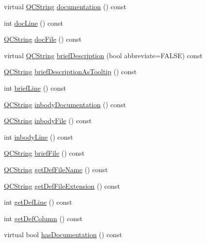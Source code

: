 \begin{DoxyCompactItemize}
virtual \mbox{\hyperlink{class_q_c_string}{Q\+C\+String}} \mbox{\hyperlink{class_definition_a4775976f52978089164213f613dbeb18}{documentation}} () const
\item 
int \mbox{\hyperlink{class_definition_a5ecf2e47a19282fbe1dc3413fd73263f}{doc\+Line}} () const
\item 
\mbox{\hyperlink{class_q_c_string}{Q\+C\+String}} \mbox{\hyperlink{class_definition_ab09272aa15b4047f0ab77652172cdd4b}{doc\+File}} () const
\item 
virtual \mbox{\hyperlink{class_q_c_string}{Q\+C\+String}} \mbox{\hyperlink{class_definition_a5c10fdd766133b46d61d28a77b65426e}{brief\+Description}} (bool abbreviate=F\+A\+L\+SE) const
\item 
\mbox{\hyperlink{class_q_c_string}{Q\+C\+String}} \mbox{\hyperlink{class_definition_a542dc2b80623c11dc2945f6ae1e1a10b}{brief\+Description\+As\+Tooltip}} () const
\item 
int \mbox{\hyperlink{class_definition_a1f87d37cefff16dc8a300795543a7059}{brief\+Line}} () const
\item 
\mbox{\hyperlink{class_q_c_string}{Q\+C\+String}} \mbox{\hyperlink{class_definition_a33e09971f67fa820e848b769fb718429}{inbody\+Documentation}} () const
\item 
\mbox{\hyperlink{class_q_c_string}{Q\+C\+String}} \mbox{\hyperlink{class_definition_affe50047c647407853ecc16bd99dc2f8}{inbody\+File}} () const
\item 
int \mbox{\hyperlink{class_definition_a59ecd8ca92f7952c598bf01da8ae7582}{inbody\+Line}} () const
\item 
\mbox{\hyperlink{class_q_c_string}{Q\+C\+String}} \mbox{\hyperlink{class_definition_a7517dda8109eca884911ac31b42faf3c}{brief\+File}} () const
\item 
\mbox{\hyperlink{class_q_c_string}{Q\+C\+String}} \mbox{\hyperlink{class_definition_a9484164b01eca0abce92001b2b77f8c3}{get\+Def\+File\+Name}} () const
\item 
\mbox{\hyperlink{class_q_c_string}{Q\+C\+String}} \mbox{\hyperlink{class_definition_a3775acf5b1b6bc11e096896b80fc663e}{get\+Def\+File\+Extension}} () const
\item 
int \mbox{\hyperlink{class_definition_ac33f1365555052b2d0861fac453c05e0}{get\+Def\+Line}} () const
\item 
int \mbox{\hyperlink{class_definition_a181d60d2e51d5550e5905732cedc51ed}{get\+Def\+Column}} () const
\item 
virtual bool \mbox{\hyperlink{class_definition_aa89347609a1643f6c4bc3852d9f773bb}{has\+Documentation}} () const

\end{DoxyCompactItemize}
